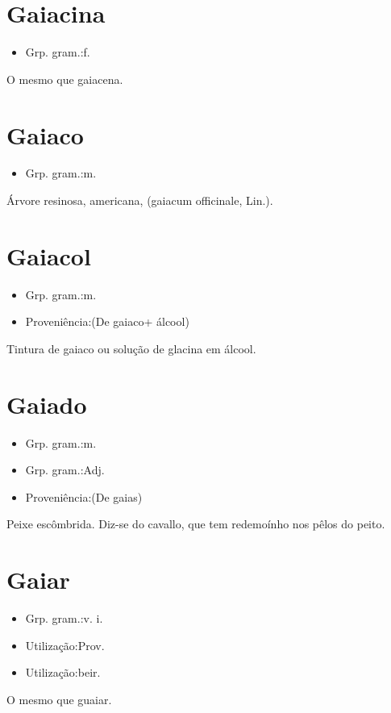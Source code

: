 \section{Gaiacina}
\begin{itemize}
\item {Grp. gram.:f.}
\end{itemize}
O mesmo que \textunderscore gaiacena\textunderscore .
\section{Gaiaco}
\begin{itemize}
\item {Grp. gram.:m.}
\end{itemize}
Árvore resinosa, americana, (\textunderscore gaiacum officinale\textunderscore , Lin.).
\section{Gaiacol}
\begin{itemize}
\item {Grp. gram.:m.}
\end{itemize}
\begin{itemize}
\item {Proveniência:(De \textunderscore gaiaco\textunderscore  + \textunderscore álcool\textunderscore )}
\end{itemize}
Tintura de gaiaco ou solução de glacina em álcool.
\section{Gaiado}
\begin{itemize}
\item {Grp. gram.:m.}
\end{itemize}
\begin{itemize}
\item {Grp. gram.:Adj.}
\end{itemize}
\begin{itemize}
\item {Proveniência:(De \textunderscore gaias\textunderscore )}
\end{itemize}
Peixe escômbrida.
Diz-se do cavallo, que tem redemoínho nos pêlos do peito.
\section{Gaiar}
\begin{itemize}
\item {Grp. gram.:v. i.}
\end{itemize}
\begin{itemize}
\item {Utilização:Prov.}
\end{itemize}
\begin{itemize}
\item {Utilização:beir.}
\end{itemize}
O mesmo que \textunderscore guaiar\textunderscore .
